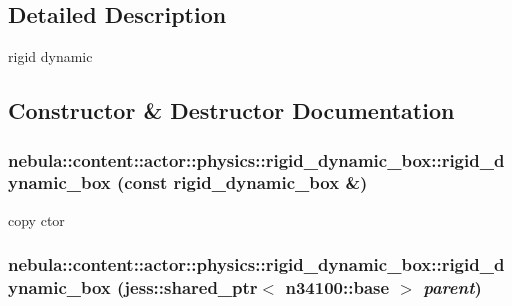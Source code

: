 \subsection{Detailed Description}
rigid dynamic 

\subsection{Constructor \& Destructor Documentation}
\hypertarget{classnebula_1_1content_1_1actor_1_1physics_1_1rigid__dynamic__box_a020c25e01a20e62f4ad1bd3b3e0f5a76}{
\subsubsection[{rigid\_\-dynamic\_\-box}]{\setlength{\rightskip}{0pt plus 5cm}nebula::content::actor::physics::rigid\_\-dynamic\_\-box::rigid\_\-dynamic\_\-box (const {\bf rigid\_\-dynamic\_\-box} \&)}}
\label{classnebula_1_1content_1_1actor_1_1physics_1_1rigid__dynamic__box_a020c25e01a20e62f4ad1bd3b3e0f5a76}


copy ctor \hypertarget{classnebula_1_1content_1_1actor_1_1physics_1_1rigid__dynamic__box_aa9eb669bb8d96607c10da5b73ccfc3a8}{
\subsubsection[{rigid\_\-dynamic\_\-box}]{\setlength{\rightskip}{0pt plus 5cm}nebula::content::actor::physics::rigid\_\-dynamic\_\-box::rigid\_\-dynamic\_\-box (jess::shared\_\-ptr$<$ {\bf n34100::base} $>$ {\em parent})}}
\label{classnebula_1_1content_1_1actor_1_1physics_1_1rigid__dynamic__box_aa9eb669bb8d96607c10da5b73ccfc3a8}


